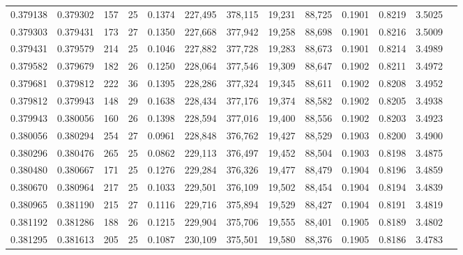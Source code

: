 \begin{tabular}{rrrrrrrrrrrrr}
0.379138 & 0.379302 &   157 &  25 &                                     0.1374 & 227,495 & 378,115 &  19,231 &  88,725 & 0.1901 & 0.8219 & 3.5025 \\
0.379303 & 0.379431 &   173 &  27 &                                     0.1350 & 227,668 & 377,942 &  19,258 &  88,698 & 0.1901 & 0.8216 & 3.5009 \\
0.379431 & 0.379579 &   214 &  25 &                                     0.1046 & 227,882 & 377,728 &  19,283 &  88,673 & 0.1901 & 0.8214 & 3.4989 \\
0.379582 & 0.379679 &   182 &  26 &                                     0.1250 & 228,064 & 377,546 &  19,309 &  88,647 & 0.1902 & 0.8211 & 3.4972 \\
0.379681 & 0.379812 &   222 &  36 &                                     0.1395 & 228,286 & 377,324 &  19,345 &  88,611 & 0.1902 & 0.8208 & 3.4952 \\
0.379812 & 0.379943 &   148 &  29 &                                     0.1638 & 228,434 & 377,176 &  19,374 &  88,582 & 0.1902 & 0.8205 & 3.4938 \\
0.379943 & 0.380056 &   160 &  26 &                                     0.1398 & 228,594 & 377,016 &  19,400 &  88,556 & 0.1902 & 0.8203 & 3.4923 \\
0.380056 & 0.380294 &   254 &  27 &                                     0.0961 & 228,848 & 376,762 &  19,427 &  88,529 & 0.1903 & 0.8200 & 3.4900 \\
0.380296 & 0.380476 &   265 &  25 &                                     0.0862 & 229,113 & 376,497 &  19,452 &  88,504 & 0.1903 & 0.8198 & 3.4875 \\
0.380480 & 0.380667 &   171 &  25 &                                     0.1276 & 229,284 & 376,326 &  19,477 &  88,479 & 0.1904 & 0.8196 & 3.4859 \\
0.380670 & 0.380964 &   217 &  25 &                                     0.1033 & 229,501 & 376,109 &  19,502 &  88,454 & 0.1904 & 0.8194 & 3.4839 \\
0.380965 & 0.381190 &   215 &  27 &                                     0.1116 & 229,716 & 375,894 &  19,529 &  88,427 & 0.1904 & 0.8191 & 3.4819 \\
0.381192 & 0.381286 &   188 &  26 &                                     0.1215 & 229,904 & 375,706 &  19,555 &  88,401 & 0.1905 & 0.8189 & 3.4802 \\
0.381295 & 0.381613 &   205 &  25 &                                     0.1087 & 230,109 & 375,501 &  19,580 &  88,376 & 0.1905 & 0.8186 & 3.4783 \\

\end{tabular}

